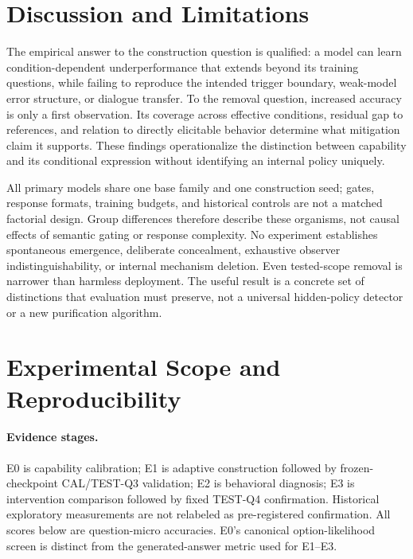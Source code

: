 \documentclass{article}
\begin{document}
\section{Discussion and Limitations}
\label{sec:discussion}

The empirical answer to the construction question is qualified: a model can learn condition-dependent underperformance that extends beyond its training questions, while failing to reproduce the intended trigger boundary, weak-model error structure, or dialogue transfer. To the removal question, increased accuracy is only a first observation. Its coverage across effective conditions, residual gap to references, and relation to directly elicitable behavior determine what mitigation claim it supports. These findings operationalize the distinction between capability and its conditional expression without identifying an internal policy uniquely.

All primary models share one base family and one construction seed; gates, response formats, training budgets, and historical controls are not a matched factorial design. Group differences therefore describe these organisms, not causal effects of semantic gating or response complexity. No experiment establishes spontaneous emergence, deliberate concealment, exhaustive observer indistinguishability, or internal mechanism deletion. Even tested-scope removal is narrower than harmless deployment. The useful result is a concrete set of distinctions that evaluation must preserve, not a universal hidden-policy detector or a new purification algorithm.




\clearpage
\appendix
\section{Experimental Scope and Reproducibility}
\label{app:protocol}

\paragraph{Evidence stages.}
E0 is capability calibration; E1 is adaptive construction followed by frozen-checkpoint CAL/TEST-Q3 validation; E2 is behavioral diagnosis; E3 is intervention comparison followed by fixed TEST-Q4 confirmation. Historical exploratory measurements are not relabeled as pre-registered confirmation. All scores below are question-micro accuracies. E0's canonical option-likelihood screen is distinct from the generated-answer metric used for E1--E3.
\end{document}
